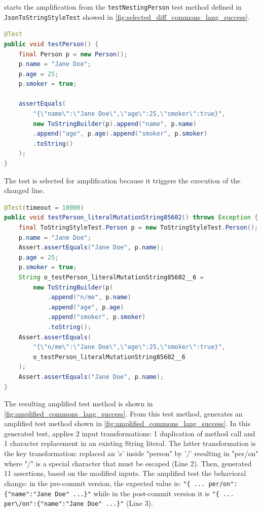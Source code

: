 \DCI starts the amplification from the \texttt{testNestingPerson} test method defined in \texttt{JsonToStringStyleTest} showed in \autoref{fig:selected_diff_commons_lang_success}. 

\begin{lstlisting}[language=java,caption=Selected test method as a seed to be amplified for commit \textsc{3fadfdd} from commons-lang.,label=fig:selected_diff_commons_lang_success]
@Test
public void testPerson() {
	final Person p = new Person();
	p.name = "Jane Doe";
	p.age = 25;
	p.smoker = true;

	assertEquals(
		"{\"name\":\"Jane Doe\",\"age\":25,\"smoker\":true}",
		new ToStringBuilder(p).append("name", p.name)
		.append("age", p.age).append("smoker", p.smoker)
		.toString()
	);
}
\end{lstlisting}

The test is selected for amplification because it triggers the execution of the changed line.

\begin{lstlisting}[language=java,caption=Test generated by DCI that detects the behavioral change of \textsc{3fadfdd} from commons-lang.,label=fig:amplified_commons_lang_success]
@Test(timeout = 10000)
public void testPerson_literalMutationString85602() throws Exception {
	final ToStringStyleTest.Person p = new ToStringStyleTest.Person();
	p.name = "Jane Doe";
	Assert.assertEquals("Jane Doe", p.name);
	p.age = 25;
	p.smoker = true;
	String o_testPerson_literalMutationString85602__6 = 
		new ToStringBuilder(p)
			.append("n/me", p.name)
			.append("age", p.age)
			.append("smoker", p.smoker)
			.toString();
	Assert.assertEquals(
		"{\"n/me\":\"Jane Doe\",\"age\":25,\"smoker\":true}",
		o_testPerson_literalMutationString85602__6
	);
	Assert.assertEquals("Jane Doe", p.name);
}
\end{lstlisting}

The resulting amplified test method is shown in \autoref{fig:amplified_commons_lang_success}.
From this test method, \DCI generates an amplified test method shown in \autoref{fig:amplified_commons_lang_success}. 
In this generated test, \sbampl applies 2 input transformations: 1 duplication of method call and 1 character replacement in an existing String literal.
The latter transformation is the key transformation: \DCI replaced an 's' inside "person" by '/' resulting in "per/on" where "/" is a special character that must be escaped (Line 2). 
Then, \DCI generated 11 assertions, based on the modified inputs. 
The amplified test the behavioral change:
in the pre-commit version, the expected value is: \texttt{"\{ ... per/on":\{"name":"Jane Doe" ...\}"} while in the post-commit version it is \texttt{"\{ ... per\textbackslash/on":\{"name":"Jane Doe" ...\}"} (Line 3).
 
